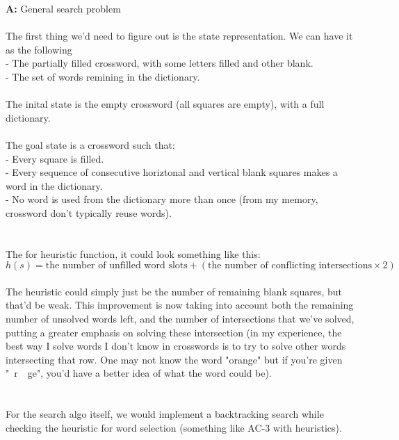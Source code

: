 \documentclass[11pt]{article}
\begin{document}
    \noindent \textbf{A: } General search problem \\
    \\
    The first thing we'd need to figure out is the state representation. We can have it as the following \\
    - The partially filled crossword, with some letters filled and other blank. \\
    - The set of words remining in the dictionary. \\
    \\
    The inital state is the empty crossword (all squares are empty), with a full dictionary. \\
    \\
    The goal state is a crossword such that: \\
    - Every square is filled.\\
    - Every sequence of consecutive horiztonal and vertical blank squares makes a word in the dictionary. \\
    - No word is used from the dictionary more than once (from my memory, crossword don't typically reuse words). \\
    \\
    \\
    The for heuristic function, it could look something like this: \\
    $h(s) = \text{the number of unfilled word slots} + (\text{the number of conflicting intersections} \times 2)$ \\
    \\
    The heuristic could simply just be the number of remaining blank squares, but that'd be weak. This improvement is now taking into account both the remaining number of unsolved words left, and the number of intersections that we've solved, putting a greater emphasis on solving these intersection (in my experience, the best way I solve words I don't know in crosswords is to try to solve other words intersecting that row. One may not know the word "orange" but if you're given "~r~~ge", you'd have a better idea of what the word could be). \\
    \\
    \\
    For the search algo itself, we would implement a backtracking search while checking the heuristic for word selection (something like AC-3 with heuristics).\\
    
    \newpage
\end{document}
